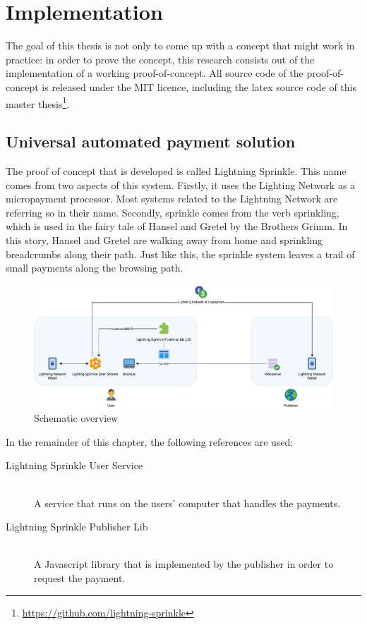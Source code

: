 \chapter{Implementation}
\label{cha:implementation}

The goal of this thesis is not only to come up with a concept that might work in practice: in order to prove the concept, this research consists out of the implementation of a working proof-of-concept. All source code of the proof-of-concept is released under the MIT licence, including the latex source code of this master thesis\footnote{\url{https://github.com/lightning-sprinkle}}.

\section{Universal automated payment solution}
The proof of concept that is developed is called Lightning Sprinkle. This name comes from two aspects of this system. Firstly, it uses the Lighting Network as a micropayment processor. Most systems related to the Lightning Network are referring so in their name. Secondly, sprinkle comes from the verb sprinkling, which is used in the fairy tale of Hansel and Gretel by the Brothers Grimm. In this story, Hansel and Gretel are walking away from home and sprinkling breadcrumbs along their path. Just like this, the sprinkle system leaves a trail of small payments along the browsing path.
\begin{figure}[h!]
  \includegraphics[width=\textwidth]{images/implementation.pdf}
  \caption{Schematic overview}
\end{figure}
In the remainder of this chapter, the following references are used:

\begin{description}
  \item[Lightning Sprinkle User Service] \hfill \\ A service that runs on the users' computer that handles the payments.
  \item[Lightning Sprinkle Publisher Lib] \hfill \\ A Javascript library that is implemented by the publisher in order to request the payment.
\end{description} 

